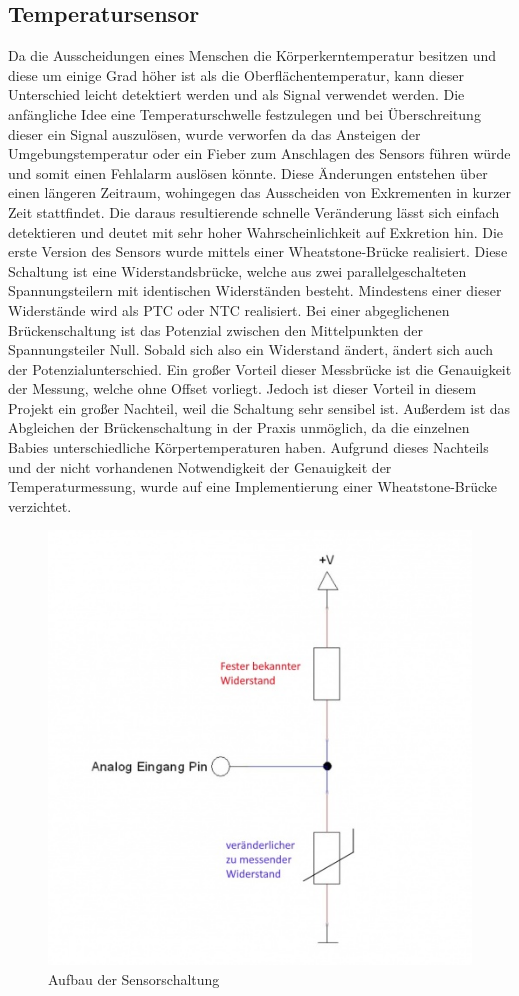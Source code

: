 \subsection{Temperatursensor}
Da die Ausscheidungen eines Menschen die Körperkerntemperatur besitzen
und diese um einige Grad höher ist als die Oberflächentemperatur, kann
dieser Unterschied leicht detektiert werden und als Signal verwendet
werden. Die anfängliche Idee eine Temperaturschwelle festzulegen und
bei Überschreitung dieser ein Signal auszulösen, wurde verworfen da
das Ansteigen der Umgebungstemperatur oder ein Fieber zum Anschlagen
des Sensors führen würde und somit einen Fehlalarm auslösen könnte.
Diese Änderungen entstehen über einen längeren Zeitraum, wohingegen
das Ausscheiden von Exkrementen in kurzer Zeit stattfindet. Die daraus
resultierende schnelle Veränderung lässt sich einfach detektieren und
deutet mit sehr hoher Wahrscheinlichkeit auf Exkretion hin.
Die erste Version des Sensors wurde mittels einer Wheatstone-Brücke
realisiert. Diese Schaltung ist eine Widerstandsbrücke, welche aus
zwei parallelgeschalteten Spannungsteilern mit identischen
Widerständen besteht. Mindestens einer dieser Widerstände wird als PTC
oder NTC realisiert. Bei einer abgeglichenen Brückenschaltung ist das
Potenzial zwischen den Mittelpunkten der Spannungsteiler Null. Sobald
sich also ein Widerstand ändert, ändert sich auch der
Potenzialunterschied. Ein großer Vorteil dieser Messbrücke ist die
Genauigkeit der Messung, welche ohne Offset vorliegt. Jedoch ist
dieser Vorteil in diesem Projekt ein großer Nachteil, weil die Schaltung
sehr sensibel ist. Außerdem ist das Abgleichen der Brückenschaltung in der Praxis unmöglich, da die einzelnen Babies unterschiedliche Körpertemperaturen haben. Aufgrund dieses Nachteils und der nicht vorhandenen Notwendigkeit der
Genauigkeit der Temperaturmessung, wurde auf eine Implementierung einer Wheatstone-Brücke verzichtet.

\begin{figure}
\centering
\includegraphics[width=.6\textwidth]{includes/sensor_pics/486px-KY-013_VoltDivide.jpg}
\caption{Aufbau der Sensorschaltung}
\label{fig:tempsens}
\end{figure}

